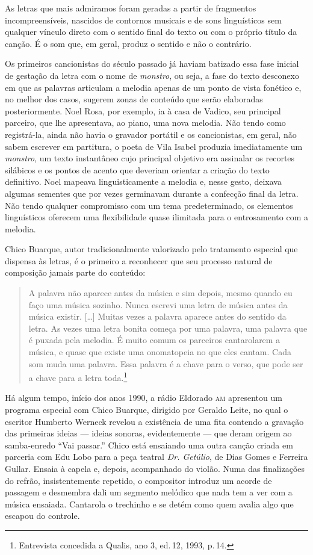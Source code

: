 As letras que mais admiramos foram geradas a partir de fragmentos incompreensíveis, nascidos de contornos musicais e de sons linguísticos
sem qualquer vínculo direto com o sentido final do texto ou com o
próprio título da canção. É o som que, em geral, produz o sentido e não
o contrário.

Os primeiros cancionistas do século passado já haviam batizado essa fase
inicial de gestação da letra com o nome de \textit{monstro}, ou seja, a fase
do texto desconexo em que as palavras articulam a melodia apenas de um
ponto de vista fonético e, no melhor dos casos, sugerem zonas de
conteúdo que serão elaboradas posteriormente. Noel Rosa, por exemplo, ia
à casa de Vadico, seu principal parceiro, que lhe apresentava, ao piano,
uma nova melodia. Não tendo como registrá-la, ainda não havia o gravador
portátil e os cancionistas, em geral, não sabem escrever em partitura,
o poeta de Vila Isabel produzia imediatamente um \textit{monstro}, um texto
instantâneo cujo principal objetivo era assinalar os recortes silábicos
e os pontos de acento que deveriam orientar a criação do texto
definitivo. Noel mapeava linguisticamente a melodia e, nesse gesto,
deixava algumas sementes que por vezes germinavam durante a confecção
final da letra. Não tendo qualquer compromisso com um tema
predeterminado, os elementos linguísticos oferecem uma flexibilidade
quase ilimitada para o entrosamento com a melodia.

Chico Buarque, autor tradicionalmente valorizado pelo tratamento
especial que dispensa às letras, é o primeiro a reconhecer que seu
processo natural de composição jamais parte do conteúdo:

\begin{quote}
A palavra não aparece antes da música e sim depois, mesmo quando eu faço
uma música sozinho. Nunca escrevi uma letra de música antes da música
existir. {[}\ldots{]} Muitas vezes a palavra aparece antes do sentido da
letra. As vezes uma letra bonita começa por uma palavra, uma palavra que
é puxada pela melodia. É muito comum os parceiros cantarolarem a música,
e quase que existe uma onomatopeia no que eles cantam. Cada som muda uma
palavra. Essa palavra é a chave para o verso, que pode ser a chave para
a letra toda.\footnote{Entrevista concedida a Qualis, ano 3, ed.\,12, 1993, p.\,14.}
\end{quote}

Há algum tempo, início dos anos 1990, a rádio Eldorado \textsc{am} apresentou um
programa especial com Chico Buarque, dirigido por Geraldo Leite, no qual
o escritor Humberto Werneck revelou a existência de uma fita contendo a
gravação das primeiras ideias --- ideias sonoras, evidentemente --- que
deram origem ao samba-enredo ``Vai passar.'' Chico está ensaiando uma outra
canção criada em parceria com Edu Lobo para a peça teatral \textit{Dr. Getúlio},
de Dias Gomes e Ferreira Gullar. Ensaia à capela e, depois, acompanhado
do violão. Numa das finalizações do refrão, insistentemente repetido, o
compositor introduz um acorde de passagem e desmembra dali um segmento
melódico que nada tem a ver com a música ensaiada. Cantarola o trechinho
e se detém como quem avalia algo que escapou do controle.


